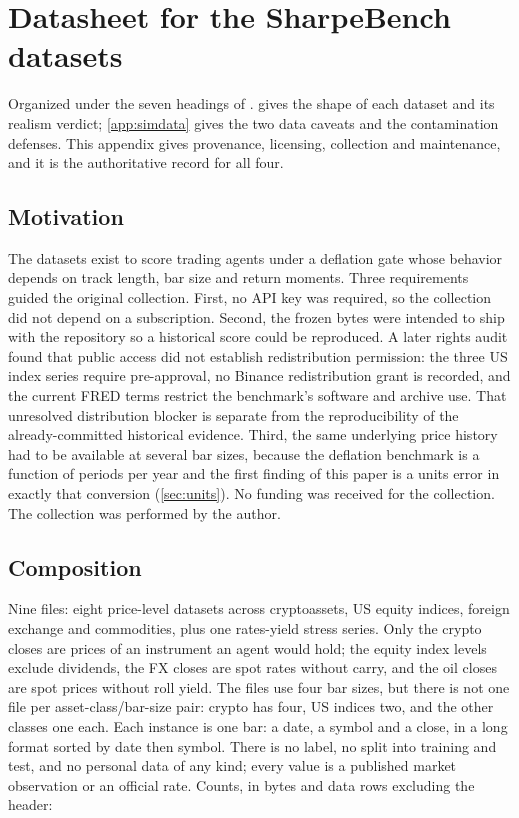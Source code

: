 \section{Datasheet for the SharpeBench datasets}\label{app:datasheet}

Organized under the seven headings of \citet{gebru2021datasheets}.  gives the shape of each dataset and its realism verdict; \cref{app:simdata} gives the two data caveats and the contamination defenses. This appendix gives provenance, licensing, collection and maintenance, and it is the authoritative record for all four.

\subsection{Motivation}

The datasets exist to score trading agents under a deflation gate whose behavior depends on track length, bar size and return moments. Three requirements guided the original collection. First, no API key was required, so the collection did not depend on a subscription. Second, the frozen bytes were intended to ship with the repository so a historical score could be reproduced. A later rights audit found that public access did not establish redistribution permission: the three US index series require pre-approval, no Binance redistribution grant is recorded, and the current FRED terms restrict the benchmark's software and archive use. That unresolved distribution blocker is separate from the reproducibility of the already-committed historical evidence. Third, the same underlying price history had to be available at several bar sizes, because the deflation benchmark is a function of periods per year and the first finding of this paper is a units error in exactly that conversion (\cref{sec:units}). No funding was received for the collection. The collection was performed by the author.

\subsection{Composition}

Nine files: eight price-level datasets across cryptoassets, US equity indices, foreign exchange and commodities, plus one rates-yield stress series. Only the crypto closes are prices of an instrument an agent would hold; the equity index levels exclude dividends, the FX closes are spot rates without carry, and the oil closes are spot prices without roll yield. The files use four bar sizes, but there is not one file per asset-class/bar-size pair: crypto has four, US indices two, and the other classes one each. Each instance is one bar: a date, a symbol and a close, in a long format sorted by date then symbol. There is no label, no split into training and test, and no personal data of any kind; every value is a published market observation or an official rate. Counts, in bytes and data rows excluding the header:

